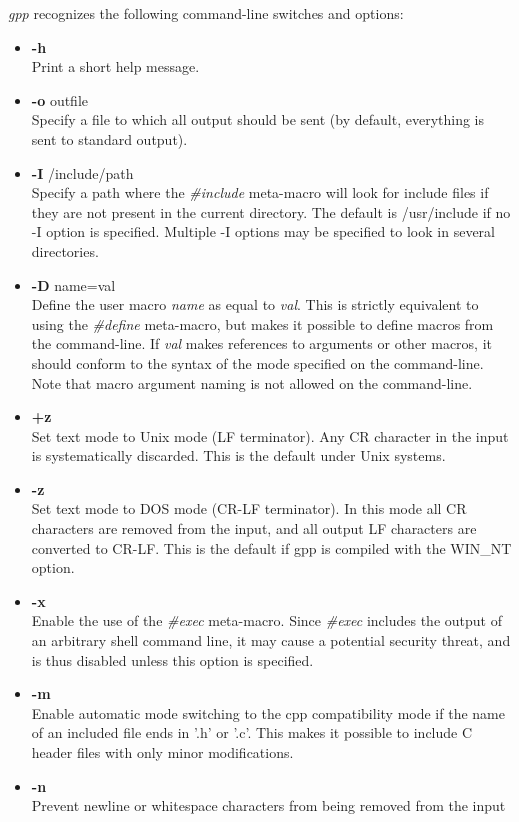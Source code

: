 {\it gpp} recognizes the following command-line switches and options:
\begin{itemize}\item
{\bf -h} \\
Print a short help message.
\item
{\bf -o } outfile\\
Specify a file to which all output should be sent (by default, everything
is sent to standard output).
\item
{\bf -I} /include/path\\
Specify a path where the {\it \#include} meta-macro will look for include
files if they are not present in the current directory. The default is   
/usr/include if no -I option is specified. Multiple -I options may be
specified to look in several directories.
\item
{\bf -D} name=val\\
Define the user macro {\it name} as equal to {\it val}. This is strictly
equivalent to using the {\it \#define} meta-macro, but makes it possible
to define macros from the command-line. If {\it val} makes references to
arguments or other macros, it should conform to the syntax of the mode
specified on the command-line. Note that macro argument naming is not
allowed on the command-line.
\item
{\bf +z} \\
Set text mode to Unix mode (LF terminator). Any CR character in the
input is systematically discarded. This is the default under Unix systems.
\item
{\bf -z} \\
Set text mode to DOS mode (CR-LF terminator). In this mode all CR characters
are removed from the input, and all output LF characters are converted to
CR-LF. This is the default if gpp is compiled with the WIN\_NT option. 
\item
{\bf -x} \\
Enable the use of the {\it \#exec} meta-macro. Since {\it \#exec} includes
the output of an arbitrary shell command line, it may cause a potential
security threat, and is thus disabled unless this option is specified.
\item
{\bf -m} \\
Enable automatic mode switching to the cpp compatibility mode if the name
of an included file ends in '.h' or '.c'. This makes it possible to
include C header files with only minor modifications.
\item
{\bf -n} \\
Prevent newline or whitespace characters from being removed from the input

\end{itemize}

